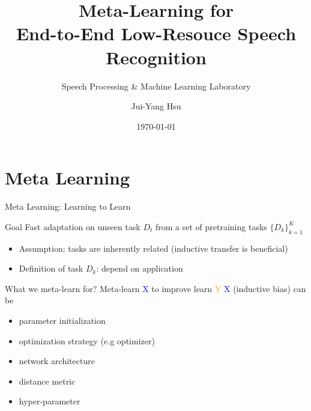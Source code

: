\documentclass{beamer}
\title{Meta-Learning for\\ End-to-End Low-Resouce Speech Recognition}
\subtitle{\textcolor[rgb]{0.00,0.50,1.00}{{Speech Processing \& Machine Learning Laboratory}}}
\author{Jui-Yang Hsu}
\date{\today}
\begin{document}
\begin{frame}
\maketitle
\end{frame}



\section{Meta Learning}
\begin{frame}[t]{Meta Learning: Learning to Learn}
  \begin{block}{Goal}
    Fast adaptation on unseen task $D_t$ from a set of pretraining tasks $\{ D_k\}^{K}_{k=1}$ 
  \end{block}

  \pause 

  \begin{itemize}
    \item Assumption: tasks are inherently related (inductive transfer is beneficial)
    \item Definition of task $D_k$: depend on application
  \end{itemize}
\end{frame}

\begin{frame}[t]{What we meta-learn for?}
  \centering Meta-learn \textcolor{blue}{X} to improve learn \textcolor{orange}{Y}
  \pause
  \flushleft \textcolor{blue}{X} (inductive bias) can be
  \begin{itemize}
    \item parameter initialization
    \item optimization strategy (e.g optimizer)
    \item network architecture
    \item distance metric
    \item hyper-parameter
  \end{itemize}
\end{frame}
\end{document}
